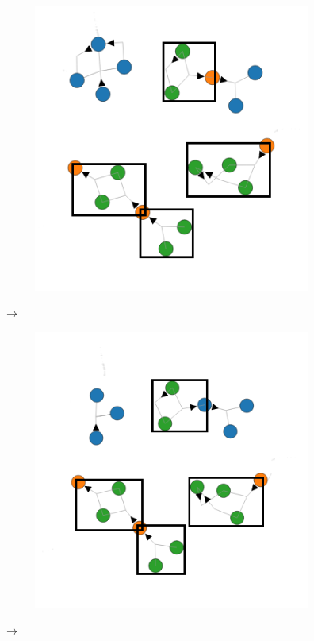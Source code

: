     \begin{figure}[H]
        \centering
        \begin{subfigure}{0.4\linewidth}
            \includegraphics[width=\textwidth]{diagrams/all-diagrams.png}
        \end{subfigure}
        $\longrightarrow$
        \begin{subfigure}{0.4\linewidth}
            \includegraphics[width=\textwidth]{diagrams/all-diagrams-r1.png}
        \end{subfigure}
        $\longrightarrow$
    \end{figure}

